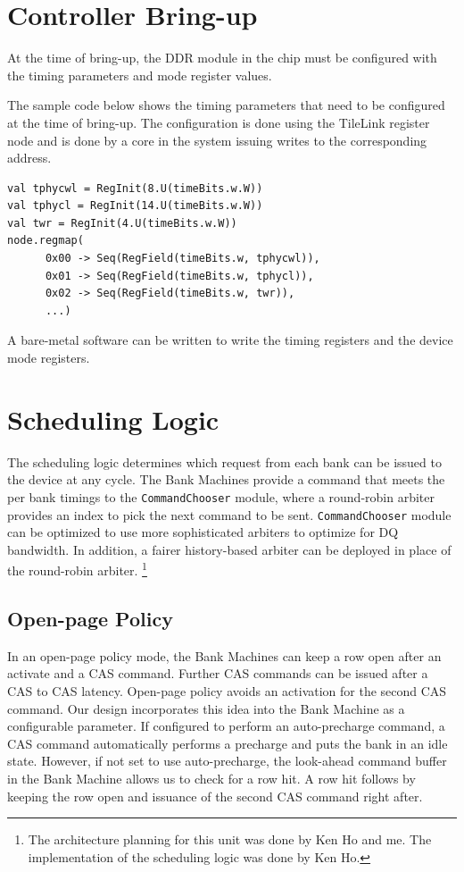 \section{Controller Bring-up}
At the time of bring-up, the DDR module in the chip must be configured with the timing parameters and mode register values.

The sample code below shows the timing parameters that need to be configured at the time of bring-up. The configuration is done using the TileLink register node and is done by a core in the system issuing writes to the corresponding address.
\begin{verbatim}
val tphycwl = RegInit(8.U(timeBits.w.W))
val tphycl = RegInit(14.U(timeBits.w.W))
val twr = RegInit(4.U(timeBits.w.W))
node.regmap(
      0x00 -> Seq(RegField(timeBits.w, tphycwl)),
      0x01 -> Seq(RegField(timeBits.w, tphycl)),
      0x02 -> Seq(RegField(timeBits.w, twr)),
      ...)
\end{verbatim}

A bare-metal software can be written to write the timing registers and the device mode registers. 

\section{Scheduling Logic}
The scheduling logic determines which request from each bank can be issued to the device at any cycle. The Bank Machines provide a command that meets the per bank timings to the \verb|CommandChooser| module, where a round-robin arbiter provides an index to pick the next command to be sent. \verb|CommandChooser| module can be optimized to use more sophisticated arbiters to optimize for DQ bandwidth. In addition, a fairer history-based arbiter can be deployed in place of the round-robin arbiter. \footnote{The architecture planning for this unit was done by Ken Ho and me. The implementation of the scheduling logic was done by Ken Ho.
}

\subsection{Open-page Policy}
In an open-page policy mode, the Bank Machines can keep a row open after an activate and a CAS command. Further CAS commands can be issued after a CAS to CAS latency. Open-page policy avoids an activation for the second CAS command. Our design incorporates this idea into the Bank Machine as a configurable parameter. If configured to perform an auto-precharge command, a CAS command automatically performs a precharge and puts the bank in an idle state. However, if not set to use auto-precharge, the look-ahead command buffer in the Bank Machine allows us to check for a row hit. A row hit follows by keeping the row open and issuance of the second CAS command right after. 

